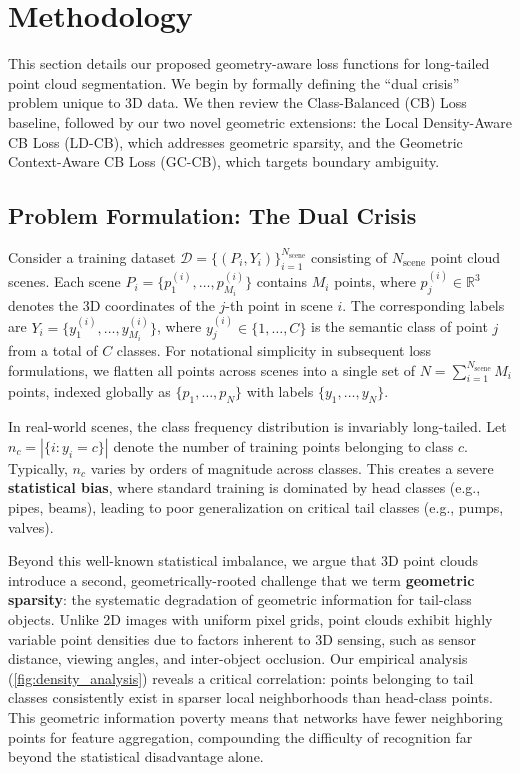 \documentclass[preprint,12pt]{elsarticle}
\begin{document}
\section{Methodology}
\label{sec:methodology}
This section details our proposed geometry-aware loss functions for long-tailed point cloud segmentation. We begin by formally defining the ``dual crisis'' problem unique to 3D data. We then review the Class-Balanced (CB) Loss baseline, followed by our two novel geometric extensions: the Local Density-Aware CB Loss (LD-CB), which addresses geometric sparsity, and the Geometric Context-Aware CB Loss (GC-CB), which targets boundary ambiguity.

\subsection{Problem Formulation: The Dual Crisis}
\label{sec:problem_formulation}
Consider a training dataset \(\mathcal{D} = \{(P_i, Y_i)\}_{i=1}^{N_{\text{scene}}}\) consisting of \(N_{\text{scene}}\) point cloud scenes. Each scene \(P_i = \{p_1^{(i)}, \ldots, p_{M_i}^{(i)}\}\) contains \(M_i\) points, where \(p_j^{(i)} \in \mathbb{R}^3\) denotes the 3D coordinates of the \(j\)-th point in scene \(i\). The corresponding labels are \(Y_i = \{y_1^{(i)}, \ldots, y_{M_i}^{(i)}\}\), where \(y_j^{(i)} \in \{1, \ldots, C\}\) is the semantic class of point \(j\) from a total of \(C\) classes. For notational simplicity in subsequent loss formulations, we flatten all points across scenes into a single set of \(N = \sum_{i=1}^{N_{\text{scene}}} M_i\) points, indexed globally as \(\{p_1, \ldots, p_N\}\) with labels \(\{y_1, \ldots, y_N\}\).

In real-world scenes, the class frequency distribution is invariably long-tailed. Let \(n_c = |\{i : y_i = c\}|\) denote the number of training points belonging to class \(c\). Typically, \(n_c\) varies by orders of magnitude across classes. This creates a severe \textbf{statistical bias}, where standard training is dominated by head classes (e.g., pipes, beams), leading to poor generalization on critical tail classes (e.g., pumps, valves).

Beyond this well-known statistical imbalance, we argue that 3D point clouds introduce a second, geometrically-rooted challenge that we term \textbf{geometric sparsity}: the systematic degradation of geometric information for tail-class objects. Unlike 2D images with uniform pixel grids, point clouds exhibit highly variable point densities due to factors inherent to 3D sensing, such as sensor distance, viewing angles, and inter-object occlusion. Our empirical analysis (\autoref{fig:density_analysis}) reveals a critical correlation: points belonging to tail classes consistently exist in sparser local neighborhoods than head-class points. This geometric information poverty means that networks have fewer neighboring points for feature aggregation, compounding the difficulty of recognition far beyond the statistical disadvantage alone.
\end{document}
